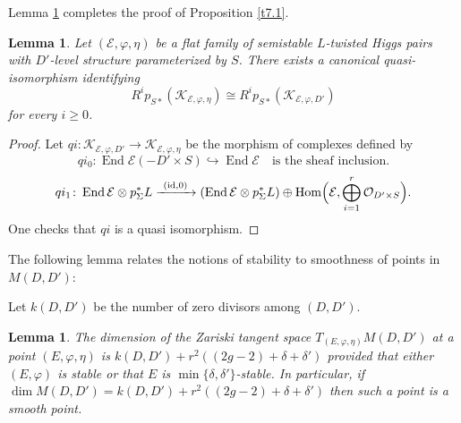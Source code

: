 \documentclass[12pt,a4paper,oneside,english]{smfart}
\newtheorem{lem}[thm]{Lemma}
\theoremstyle{definition}
\theoremstyle{remark}
\DeclareMathOperator{\End}{End}
\DeclareMathOperator{\Hom}{Hom}
\newcommand{\cO}{\mathcal{O}}
\newcommand{\cE}{\mathcal{E}}
\newcommand{\KK}{\mathscr{K}}
\begin{document}
Lemma \ref{t7.6} completes the proof of Proposition \ref{t7.1}.

\begin{lem}\label{t7.6}
Let $(\cE, \varphi, \eta)$ be a flat family of semistable $L$-twisted Higgs pairs with $D'$-level structure parameterized by $S$. There exists a canonical quasi-isomorphism identifying
\[
R^i p_{S*}(\KK_{\cE, \varphi, \eta}) \cong R^i p_{S*}(\KK_{\cE, \varphi, D'})
\]
for every $i \geqslant 0$.
\end{lem}

\begin{proof}
Let $qi \colon \KK_{\cE, \varphi, D'} \to \KK_{\cE, \varphi, \eta}$ be the morphism of complexes defined by
\[
qi_0 \colon \End \cE(-D' \times S) \hookrightarrow \End \cE \quad \text{is the sheaf inclusion.}
\]
\[
qi_1 \colon \End \cE \otimes p_\Sigma^* L \xrightarrow{\ (\mathrm{id}, 0)\ } (\End \cE \otimes p_\Sigma^* L) \oplus \Hom\Bigl(\cE, \bigoplus_{i=1}^{r} \cO_{D' \times S}\Bigr).
\]
One checks that $qi$ is a quasi isomorphism.
\end{proof}

The following lemma relates the notions of stability to smoothness of points in $M(D, D')$:

Let $k(D, D')$ be the number of zero divisors among $(D, D')$.

\begin{lem}\label{t7.7}
The dimension of the Zariski tangent space $T_{(E, \varphi, \eta)}M(D, D')$ at a point $(E, \varphi, \eta)$ is $k(D, D') + r^2((2g - 2) + \delta + \delta')$ provided that either $(E, \varphi)$ is stable or that $E$ is $\min\{\delta, \delta'\}$-stable. In particular, if $\dim M(D, D') = k(D, D') + r^2((2g - 2) + \delta + \delta')$ then such a point is a smooth point.
\end{lem}
\end{document}

